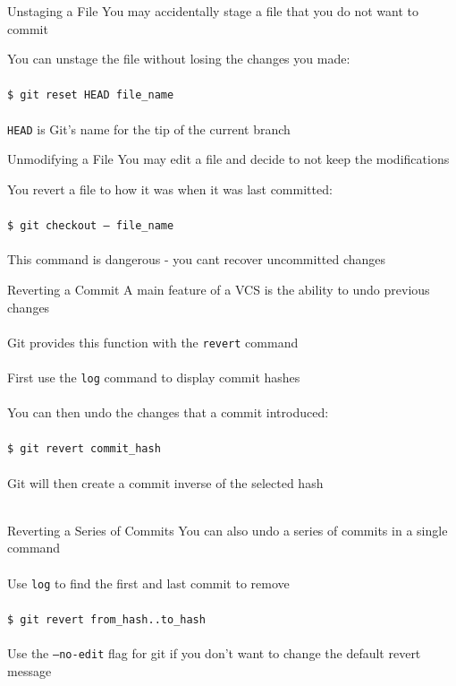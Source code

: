 \documentclass{beamer}
\begin{document}
\begin{frame}{Unstaging a File}
    You may accidentally stage a file that you do not want to commit

    You can unstage the file without losing the changes you made:\\~\\
    {\tt \$ git reset HEAD file\_name} \\~\\
    {\tt HEAD} is Git's name for the tip of the current branch   
\end{frame}

\begin{frame}{Unmodifying a File}
    You may edit a file and decide to not keep the modifications

    You revert a file to how it was when it was last committed: \\~\\
    
    {\tt \$ git checkout -- file\_name} \\~\\

    This command is dangerous - you cant recover uncommitted changes
\end{frame}

\begin{frame}{Reverting a Commit}
    A main feature of a VCS is the ability to undo previous changes \\~\\

    Git provides this function with the {\tt revert} command \\~\\

    First use the {\tt log} command to display commit hashes \\~\\

    You can then undo the changes that a commit introduced: \\~\\
    
    {\tt \$ git revert commit\_hash} \\~\\

    Git will then create a commit inverse of the selected hash \\~\\
\end{frame}

\begin{frame}{Reverting a Series of Commits}
    You can also undo a series  of commits in a single command \\~\\

    Use {\tt log} to find the first and last commit to remove \\~\\

    {\tt \$ git revert from\_hash..to\_hash} \\~\\

    Use the {\tt --no-edit} flag for git if you don't want to change the default
    revert message
\end{frame}
\end{document}
